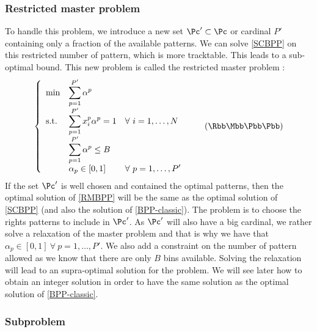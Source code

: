 \subsubsection{Restricted master problem}

To handle this problem, we introduce a new set $\Pc' \subset \Pc$ or cardinal $P'$ containing only a fraction of the available patterns. We can solve \eqref{SCBPP} on this restricted number of pattern, which is more tracktable. This leads to a sub-optimal bound. This new problem is called the restricted master problem :
\begin{equation}
	\label{RMBPP}
	\left \{
	\begin{array}{*5{>{\displaystyle}l}}
	\min & \sum_{p=1}^{P'} \alpha^p \\
	\st & \sum_{p=1}^{P'} x_i^p\alpha^p = 1 & \forall \ i = 1,\dots,N \\
	& \sum_{p=1}^{P'} \alpha^p \leq B \\
	& \alpha_{p} \in [0,1] &  \forall \ p = 1,\dots,P'
	\end{array}
	\right.
	\tag{$\Rbb\Mbb\Bbb\Pbb\Pbb$}
\end{equation}
If the set $\Pc'$ is well chosen and contained the optimal patterns, then the optimal solution of \eqref{RMBPP} will be the same as the optimal solution of \eqref{SCBPP} (and also the solution of \eqref{BPP-classic}). The problem is to choose the rights patterns to include in $\Pc'$. As $\Pc'$ will also have a big cardinal, we rather solve a relaxation of the master problem and that is why we have that $\alpha_{p} \in [0,1] \ \forall \ p = 1,\dots,P'$. We also add a constraint on the number of pattern allowed as we know that there are only $B$ bins available. Solving the relaxation will lead to an supra-optimal solution for the problem. We will see later how to obtain an integer solution in order to have the same solution as the optimal solution of \eqref{BPP-classic}.

\subsubsection{Subproblem}

